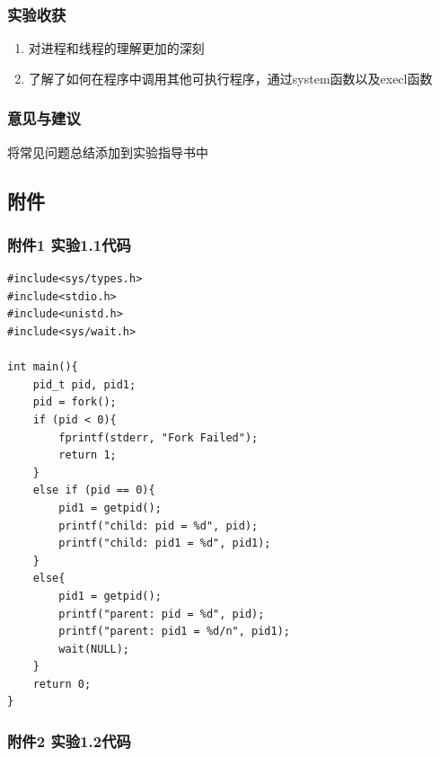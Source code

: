 \documentclass{article}
\begin{document}
    \subsubsection{实验收获}

    \begin{enumerate}
        \item 对进程和线程的理解更加的深刻
        \item 了解了如何在程序中调用其他可执行程序，通过system函数以及execl函数
    \end{enumerate}    


    \subsubsection{意见与建议}

    将常见问题总结添加到实验指导书中


    \newpage
    \subsection{附件}
    \subsubsection{附件1 实验1.1代码}
    \lstset{language=C}
    \begin{lstlisting}
#include<sys/types.h>
#include<stdio.h>
#include<unistd.h>
#include<sys/wait.h>

int main(){
    pid_t pid, pid1;
    pid = fork();
    if (pid < 0){
        fprintf(stderr, "Fork Failed");
        return 1;
    }
    else if (pid == 0){
        pid1 = getpid();
        printf("child: pid = %d", pid);
        printf("child: pid1 = %d", pid1);
    }
    else{
        pid1 = getpid();
        printf("parent: pid = %d", pid);
        printf("parent: pid1 = %d/n", pid1);
        wait(NULL);
    }
    return 0;
}
        \end{lstlisting}
        
    \subsubsection{附件2 实验1.2代码}
\end{document}
